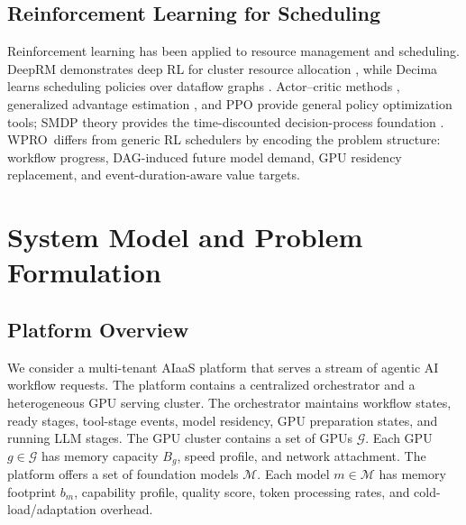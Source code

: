 \documentclass[10pt,conference]{IEEEtran}
\newcommand{\WPRO}{\textsc{WPRO}}
\newcommand{\calM}{\mathcal{M}}
\newcommand{\calG}{\mathcal{G}}
\begin{document}
\subsection{Reinforcement Learning for Scheduling}

Reinforcement learning has been applied to resource management and scheduling. DeepRM demonstrates deep RL for cluster resource allocation \cite{mao2016deeprm}, while Decima learns scheduling policies over dataflow graphs \cite{mao2019decima}. Actor--critic methods \cite{mnih2016asynchronous}, generalized advantage estimation \cite{schulman2016gae}, and PPO \cite{schulman2017ppo} provide general policy optimization tools; SMDP theory provides the time-discounted decision-process foundation \cite{puterman1994mdp,sutton2018reinforcement}. \WPRO\ differs from generic RL schedulers by encoding the problem structure: workflow progress, DAG-induced future model demand, GPU residency replacement, and event-duration-aware value targets.

\section{System Model and Problem Formulation}

\subsection{Platform Overview}

We consider a multi-tenant AIaaS platform that serves a stream of agentic AI workflow requests. The platform contains a centralized orchestrator and a heterogeneous GPU serving cluster. The orchestrator maintains workflow states, ready stages, tool-stage events, model residency, GPU preparation states, and running LLM stages. The GPU cluster contains a set of GPUs \(\calG\). Each GPU \(g\in\calG\) has memory capacity \(B_g\), speed profile, and network attachment. The platform offers a set of foundation models \(\calM\). Each model \(m\in\calM\) has memory footprint \(b_m\), capability profile, quality score, token processing rates, and cold-load/adaptation overhead.
\end{document}
